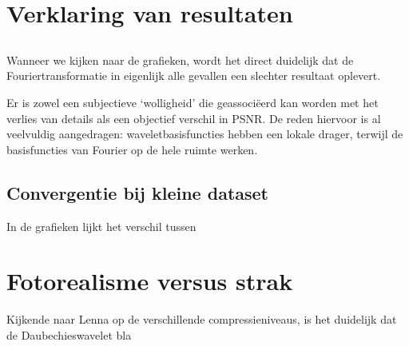 \section{Verklaring van resultaten}

\subsection{}
Wanneer we kijken naar de grafieken, wordt het direct duidelijk dat de Fouriertransformatie 
in eigenlijk alle gevallen een slechter resultaat oplevert.

Er is zowel een subjectieve `wolligheid' die geassoci\"eerd kan worden met het verlies
van details als een objectief verschil in PSNR.
De reden hiervoor is al veelvuldig aangedragen: waveletbasisfuncties hebben een lokale drager, 
terwijl de basisfuncties van Fourier op de hele ruimte werken.

\subsection{Convergentie bij kleine dataset}
In de grafieken lijkt het verschil tussen 

\section{Fotorealisme versus strak}
Kijkende naar Lenna op de verschillende compressieniveaus, is het duidelijk dat de Daubechieswavelet bla
